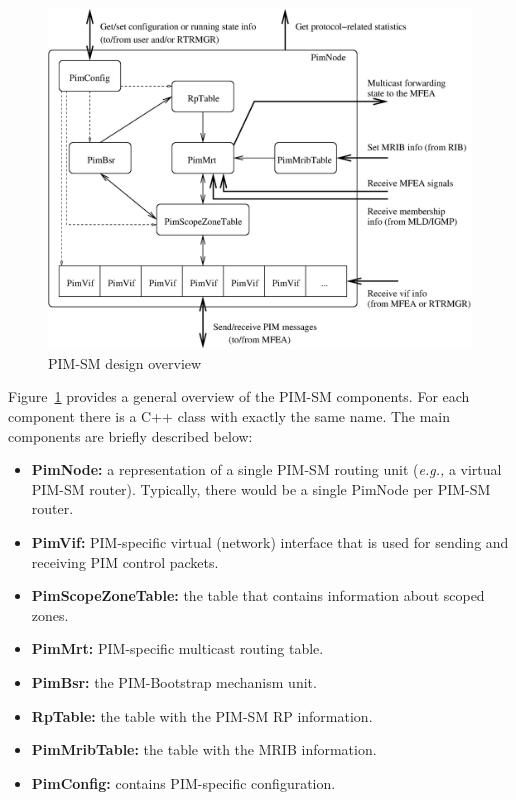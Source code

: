\documentclass[11pt]{article}
\newcommand{\eg}{\emph{e.g.,}\xspace}
\begin{document}
\begin{figure}[htbp]
  \begin{center}
    \includegraphics[width=6.0in]{figs/pim_design_overview}
    \caption{PIM-SM design overview}
    \label{fig:pim_design_overview}
  \end{center}
\end{figure}

Figure~\ref{fig:pim_design_overview} provides a general overview of the
PIM-SM components. For each component there is a C++ class with exactly
the same name. The main components are briefly described below:

\begin{itemize}

  \item {\bf PimNode:} a representation of a single PIM-SM routing unit
  (\eg a virtual PIM-SM router).
  Typically, there would be a single PimNode per PIM-SM router.

  \item {\bf PimVif:} PIM-specific virtual (network) interface that is used for
  sending and receiving PIM control packets.

  \item {\bf PimScopeZoneTable:} the table that contains information about
  scoped zones.

  \item {\bf PimMrt:} PIM-specific multicast routing table.

  \item {\bf PimBsr:} the PIM-Bootstrap mechanism unit.

  \item {\bf RpTable:} the table with the PIM-SM RP information.

  \item {\bf PimMribTable:} the table with the MRIB information.

  \item {\bf PimConfig:} contains PIM-specific configuration.

\end{itemize}
\end{document}
